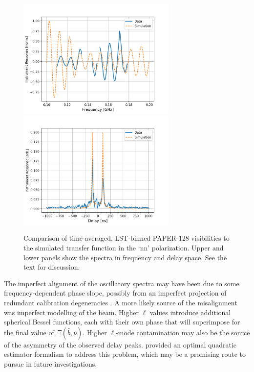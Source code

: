 \begin{figure}
\centering
\includegraphics[width=0.7\textwidth]{chapters/global_signal/figures/data_sim_freq.png}
\includegraphics[width=0.7\textwidth]{chapters/global_signal/figures/data_sim_delay.png}
\caption[Comparison of time-averaged PAPER-128 visibilities to the simulated transfer function. ]{Comparison of time-averaged, LST-binned PAPER-128 visibilities to the simulated transfer function in the `nn' polarization. Upper and lower panels show the spectra in frequency and delay space. See the text for discussion.}
\label{fig:global_signal_data_vs_sim}
\end{figure}

The imperfect alignment of the oscillatory spectra may have been due to some frequency-dependent phase slope, possibly from an imperfect projection of redundant calibration degeneracies \citep[e.g.][Chapter~\ref{chapter:polcal}]{Dillon.17}. A more likely source of the misalignment was imperfect modelling of the beam. Higher $\ell$ values introduce additional spherical Bessel functions, each with their own phase that will superimpose for the final value of $\Xi(\hat{b},\nu)$. Higher $\ell$-mode contamination may also be the source of the asymmetry of the observed delay peaks.
\cite{Presley.15} provided an optimal quadratic estimator formalism to address this problem, which may be a promising route to pursue in future investigations.

